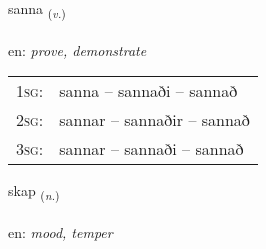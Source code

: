 \documentclass[frontgrid, backgrid]{flacards}\usepackage[]{graphicx}\usepackage[]{color}
\begin{document}
\renewcommand{\flhead}{\vskip5pt \fboxsep=0pt {\small\bfseries\footnotesize Sagnorð | Verb}}
\renewcommand{\fcfoot}{\vskip5pt \fboxsep=0pt \hspace{2pt}{\small\bfseries\footnotesize 2K}}

\renewcommand{\blhead}{\vskip5pt {\small\bfseries\footnotesize Sagnorð | Verb }}
\renewcommand{\bcfoot}{\vskip5pt \hspace{2pt}{\small\bfseries\footnotesize 2K}}


{sanna \small{\textsubscript{(\textit{v.})}} \\[1ex] %
\textphonetic{[sana]} \\
en: \emph{prove, demonstrate} \\  [2ex]
\renewcommand*{\arraystretch}{0.8}
\begin{tabular}{p{1cm}l}
\textsc{1sg}: & sanna -- sannaði -- sannað \\ 
\textsc{2sg}: & sannar -- sannaðir -- sannað \\ 
\textsc{3sg}: & sannar -- sannaði -- sannað \\ 
\end{tabular}
}

\renewcommand{\flhead}{\vskip5pt \fboxsep=0pt {\small\bfseries\footnotesize Nafnorð | Noun}}
\renewcommand{\fcfoot}{\vskip5pt \fboxsep=0pt \hspace{2pt}{\small\bfseries\footnotesize 2K}}

\renewcommand{\blhead}{\vskip5pt {\small\bfseries\footnotesize Nafnorð | Noun }}
\renewcommand{\bcfoot}{\vskip5pt \hspace{2pt}{\small\bfseries\footnotesize 2K}}


{skap \small{\textsubscript{(\textit{n.})}} \\[1ex] %
\textphonetic{[skaːp]} \\
en: \emph{mood, temper} \\  [2ex]
\renewcommand*{\arraystretch}{0.8}
}
\end{document}
